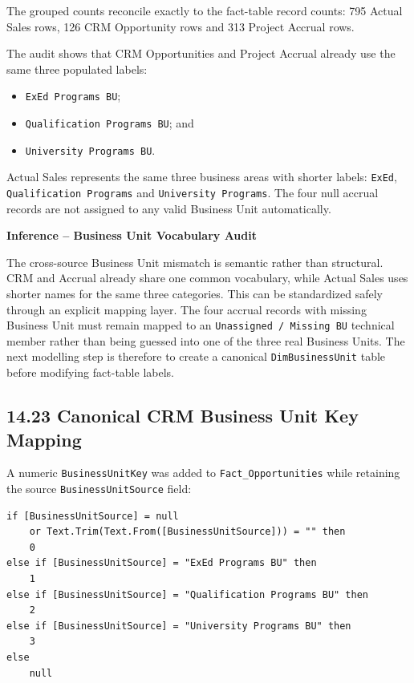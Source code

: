 \documentclass[11pt,a4paper]{article}
\begin{document}
The grouped counts reconcile exactly to the fact-table record counts:
795 Actual Sales rows, 126 CRM Opportunity rows and 313 Project Accrual rows.

The audit shows that CRM Opportunities and Project Accrual already use the same
three populated labels:

\begin{itemize}[leftmargin=7mm,itemsep=2pt]
    \item \texttt{ExEd Programs BU};
    \item \texttt{Qualification Programs BU}; and
    \item \texttt{University Programs BU}.
\end{itemize}

Actual Sales represents the same three business areas with shorter labels:
\texttt{ExEd}, \texttt{Qualification Programs} and
\texttt{University Programs}. The four null accrual records are not assigned to
any valid Business Unit automatically.

\begin{inferencebox}

\textbf{Inference -- Business Unit Vocabulary Audit}

The cross-source Business Unit mismatch is semantic rather than structural.
CRM and Accrual already share one common vocabulary, while Actual Sales uses
shorter names for the same three categories. This can be standardized safely
through an explicit mapping layer. The four accrual records with missing
Business Unit must remain mapped to an \texttt{Unassigned / Missing BU}
technical member rather than being guessed into one of the three real Business
Units. The next modelling step is therefore to create a canonical
\texttt{DimBusinessUnit} table before modifying fact-table labels.

\end{inferencebox}

\subsection{14.23 Canonical CRM Business Unit Key Mapping}

A numeric \texttt{BusinessUnitKey} was added to
\texttt{Fact\_Opportunities} while retaining the source
\texttt{BusinessUnitSource} field:

\begin{lstlisting}[style=powerquery]
if [BusinessUnitSource] = null
    or Text.Trim(Text.From([BusinessUnitSource])) = "" then
    0
else if [BusinessUnitSource] = "ExEd Programs BU" then
    1
else if [BusinessUnitSource] = "Qualification Programs BU" then
    2
else if [BusinessUnitSource] = "University Programs BU" then
    3
else
    null
\end{lstlisting}
\end{document}
